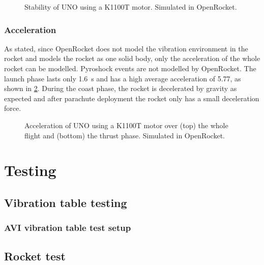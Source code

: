 \documentclass[a4paper,11pt]{article}
\begin{document}
\begin{figure}[H]
  
  \label{fig:openrocket-k-stability}
  \caption{Stability of UNO using a K1100T motor. Simulated in OpenRocket.}
\end{figure}

\subsubsection{Acceleration}

As stated, since OpenRocket does not model the vibration environment in the rocket and models the rocket as one solid body, only the acceleration of the whole rocket can be modelled. Pyroshock events are not modelled by OpenRocket. The launch phase lasts only \SI{1.6}{\second} and has a high average acceleration of \SI{5.77}{\gacc}, as shown in \ref{fig:openrocket-k-acceleration}. During the coast phase, the rocket is decelerated by gravity as expected and after parachute deployment the rocket only has a small deceleration force.

\begin{figure}[H]
  
  
  \label{fig:openrocket-k-acceleration}
  \caption{Acceleration of UNO using a K1100T motor over (top) the whole flight and (bottom) the thrust phase. Simulated in OpenRocket.}
\end{figure}


\section{Testing}

\subsection{Vibration table testing}
\subsubsection{AVI vibration table test setup}



\subsection{Rocket test}
\end{document}
